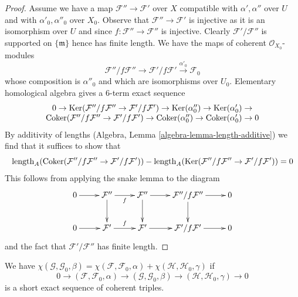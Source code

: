 \begin{proof}
\medskip\noindent
Assume we have a map $\mathcal{F}'' \to \mathcal{F}'$ over $X$ compatible with
$\alpha', \alpha''$ over $U$ and with $\alpha'_0, \alpha''_0$ over $X_0$.
Observe that $\mathcal{F}'' \to \mathcal{F}'$ is injective as it is an
isomorphism over $U$ and since $f : \mathcal{F}'' \to \mathcal{F}''$
is injective. Clearly $\mathcal{F}'/\mathcal{F}''$ is supported on
$\{\mathfrak m\}$ hence has finite length. We have the maps
of coherent $\mathcal{O}_{X_0}$-modules
$$
\mathcal{F}''/f\mathcal{F}'' \to
\mathcal{F}'/f\mathcal{F}' \xrightarrow{\alpha'_0}
\mathcal{F}_0
$$
whose composition is $\alpha''_0$ and which are isomorphisms over $U_0$.
Elementary homological algebra gives a $6$-term exact sequence
$$
\begin{matrix}
0 \to
\mathop{\mathrm{Ker}}(\mathcal{F}''/f\mathcal{F}'' \to \mathcal{F}'/f\mathcal{F}') \to
\mathop{\mathrm{Ker}}(\alpha''_0) \to
\mathop{\mathrm{Ker}}(\alpha'_0) \to \\
\mathop{\mathrm{Coker}}(\mathcal{F}''/f\mathcal{F}'' \to \mathcal{F}'/f\mathcal{F}') \to
\mathop{\mathrm{Coker}}(\alpha''_0) \to
\mathop{\mathrm{Coker}}(\alpha'_0) \to 0
\end{matrix}
$$
By additivity of lengths (Algebra, Lemma \ref{algebra-lemma-length-additive})
we find that it suffices to show that
$$
\text{length}_A(
\mathop{\mathrm{Coker}}(\mathcal{F}''/f\mathcal{F}'' \to \mathcal{F}'/f\mathcal{F}')) -
\text{length}_A(
\mathop{\mathrm{Ker}}(\mathcal{F}''/f\mathcal{F}'' \to \mathcal{F}'/f\mathcal{F}')) = 0
$$
This follows from applying the snake lemma to
the diagram
$$
\xymatrix{
0 \ar[r] &
\mathcal{F}'' \ar[r]_f \ar[d] &
\mathcal{F}'' \ar[r] \ar[d] &
\mathcal{F}''/f\mathcal{F}'' \ar[r] \ar[d] &
0 \\
0 \ar[r] &
\mathcal{F}' \ar[r]^f &
\mathcal{F}' \ar[r] &
\mathcal{F}'/f\mathcal{F}' \ar[r] &
0
}
$$
and the fact that $\mathcal{F}'/\mathcal{F}''$ has finite length.
\end{proof}

\begin{lemma}
\label{lemma-ses-chi-triple}
We have
$\chi(\mathcal{G}, \mathcal{G}_0, \beta) =
\chi(\mathcal{F}, \mathcal{F}_0, \alpha) +
\chi(\mathcal{H}, \mathcal{H}_0, \gamma)$ if
$$
0 \to
(\mathcal{F}, \mathcal{F}_0, \alpha) \to
(\mathcal{G}, \mathcal{G}_0, \beta) \to
(\mathcal{H}, \mathcal{H}_0, \gamma)
\to 0
$$
is a short exact sequence of coherent triples.
\end{lemma}

